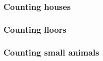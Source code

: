 \documentclass[../nihongo-gakushuu-kyouzai.tex]{subfiles}
\begin{document}
\begin{multicols}{2}
\subsubsection{Counting houses}
\begin{center}
\label{tbl:appendix-vocab-nouns-counting-houses}
\end{center}



\subsubsection{Counting floors}
\begin{center}
\label{tbl:appendix-vocab-nouns-counting-floors}
\end{center}



\subsubsection{Counting small animals}
\begin{center}
\label{tbl:appendix-vocab-nouns-counting-small-animals}
\end{center}



\end{multicols}
\end{document}
